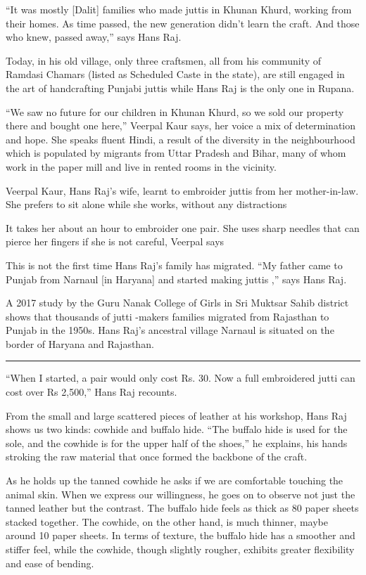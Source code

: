 \documentclass[
]{interact}
\begin{document}
``It was mostly {[}Dalit{]} families who made juttis in Khunan Khurd,
working from their homes. As time passed, the new generation didn't
learn the craft. And those who knew, passed away,'' says Hans Raj.

Today, in his old village, only three craftsmen, all from his community
of Ramdasi Chamars (listed as Scheduled Caste in the state), are still
engaged in the art of handcrafting Punjabi juttis while Hans Raj is the
only one in Rupana.

``We saw no future for our children in Khunan Khurd, so we sold our
property there and bought one here,'' Veerpal Kaur says, her voice a mix
of determination and hope. She speaks fluent Hindi, a result of the
diversity in the neighbourhood which is populated by migrants from Uttar
Pradesh and Bihar, many of whom work in the paper mill and live in
rented rooms in the vicinity.

Veerpal Kaur, Hans Raj's wife, learnt to embroider juttis from her
mother-in-law. She prefers to sit alone while she works, without any
distractions

It takes her about an hour to embroider one pair. She uses sharp needles
that can pierce her fingers if she is not careful, Veerpal says

This is not the first time Hans Raj's family has migrated. ``My father
came to Punjab from Narnaul {[}in Haryana{]} and started making juttis
,'' says Hans Raj.

A 2017 study by the Guru Nanak College of Girls in Sri Muktsar Sahib
district shows that thousands of jutti -makers families migrated from
Rajasthan to Punjab in the 1950s. Hans Raj's ancestral village Narnaul
is situated on the border of Haryana and Rajasthan.

\begin{center}\rule{0.5\linewidth}{0.5pt}\end{center}

``When I started, a pair would only cost Rs. 30. Now a full embroidered
jutti can cost over Rs 2,500,'' Hans Raj recounts.

From the small and large scattered pieces of leather at his workshop,
Hans Raj shows us two kinds: cowhide and buffalo hide. ``The buffalo
hide is used for the sole, and the cowhide is for the upper half of the
shoes,'' he explains, his hands stroking the raw material that once
formed the backbone of the craft.

As he holds up the tanned cowhide he asks if we are comfortable touching
the animal skin. When we express our willingness, he goes on to observe
not just the tanned leather but the contrast. The buffalo hide feels as
thick as 80 paper sheets stacked together. The cowhide, on the other
hand, is much thinner, maybe around 10 paper sheets. In terms of
texture, the buffalo hide has a smoother and stiffer feel, while the
cowhide, though slightly rougher, exhibits greater flexibility and ease
of bending.
\end{document}
